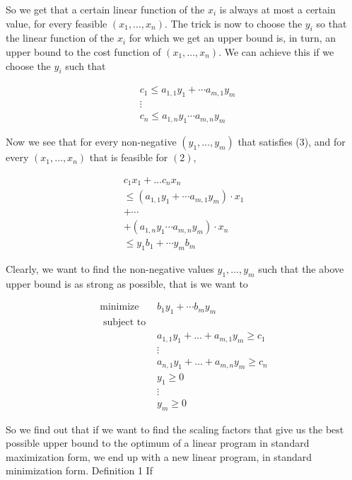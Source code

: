 \documentclass[letter,12pt]{book}
\renewcommand{\0}{\mathbf{0}}
\begin{document}
So we get that a certain linear function of the $x_{i}$ is always at most a certain value, for every feasible $\left(x_{1}, \ldots, x_{n}\right)$. The trick is now to choose the $y_{i}$ so that the linear function of the $x_{i}$ for which we get an upper bound is, in turn, an upper bound to the cost function of $\left(x_{1}, \ldots, x_{n}\right)$. We can achieve this if we choose the $y_{i}$ such that

$$
\begin{aligned}
&c_{1} \leq a_{1,1} y_{1}+\cdots a_{m, 1} y_{m} \\
&\vdots \\
&c_{n} \leq a_{1, n} y_{1} \cdots a_{m, n} y_{m}
\end{aligned}
$$

Now we see that for every non-negative $\left(y_{1}, \ldots, y_{m}\right)$ that satisfies (3), and for every $\left(x_{1}, \ldots, x_{n}\right)$ that is feasible for $(2)$,

$$
\begin{gathered}
c_{1} x_{1}+\ldots c_{n} x_{n} \\
\leq\left(a_{1,1} y_{1}+\cdots a_{m, 1} y_{m}\right) \cdot x_{1} \\
+\cdots \\
+\left(a_{1, n} y_{1} \cdots a_{m, n} y_{m}\right) \cdot x_{n} \\
\leq y_{1} b_{1}+\cdots y_{m} b_{m}
\end{gathered}
$$

Clearly, we want to find the non-negative values $y_{1}, \ldots, y_{m}$ such that the above upper bound is as strong as possible, that is we want to

$$
\begin{array}{ll}
\operatorname{minimize} & b_{1} y_{1}+\cdots b_{m} y_{m} \\
\text { subject to } & \\
& a_{1,1} y_{1}+\ldots+a_{m, 1} y_{m} \geq c_{1} \\
& \vdots \\
& a_{n, 1} y_{1}+\ldots+a_{m, n} y_{m} \geq c_{n} \\
& y_{1} \geq 0 \\
& \vdots \\
& y_{m} \geq 0
\end{array}
$$

So we find out that if we want to find the scaling factors that give us the best possible upper bound to the optimum of a linear program in standard maximization form, we end up with a new linear program, in standard minimization form. Definition 1 If
\end{document}

